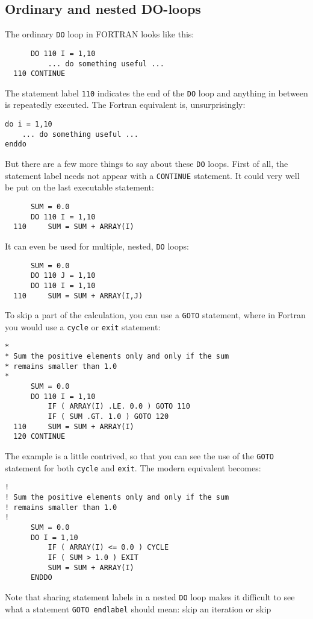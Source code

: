 \subsection{Ordinary and nested DO-loops}
The ordinary \verb+DO+ loop in FORTRAN looks like this:
%
\begin{verbatim}
      DO 110 I = 1,10
          ... do something useful ...
  110 CONTINUE
\end{verbatim}
%
The statement label \verb+110+ indicates the end of the \verb+DO+ loop and anything in between
is repeatedly executed. The Fortran equivalent is, unsurprisingly:
%
\begin{verbatim}
do i = 1,10
    ... do something useful ...
enddo
\end{verbatim}
%
But there are a few more things to say about these \verb+DO+ loops. First of all, the
statement label needs not appear with a \verb+CONTINUE+ statement. It could very well be
put on the last executable statement:
%
\begin{verbatim}
      SUM = 0.0
      DO 110 I = 1,10
  110     SUM = SUM + ARRAY(I)
\end{verbatim}
%
It can even be used for multiple, nested, \verb+DO+ loops:
%
\begin{verbatim}
      SUM = 0.0
      DO 110 J = 1,10
      DO 110 I = 1,10
  110     SUM = SUM + ARRAY(I,J)
\end{verbatim}
%
To skip a part of the calculation, you can use a \verb+GOTO+ statement, where in Fortran
you would use a \verb+cycle+ or \verb+exit+ statement:
%
\begin{verbatim}
*
* Sum the positive elements only and only if the sum
* remains smaller than 1.0
*
      SUM = 0.0
      DO 110 I = 1,10
          IF ( ARRAY(I) .LE. 0.0 ) GOTO 110
          IF ( SUM .GT. 1.0 ) GOTO 120
  110     SUM = SUM + ARRAY(I)
  120 CONTINUE
\end{verbatim}
%
The example is a little contrived, so that you can see the use of the \verb+GOTO+ statement
for both \verb+cycle+ and \verb+exit+. The modern equivalent becomes:
%
\begin{verbatim}
!
! Sum the positive elements only and only if the sum
! remains smaller than 1.0
!
      SUM = 0.0
      DO I = 1,10
          IF ( ARRAY(I) <= 0.0 ) CYCLE
          IF ( SUM > 1.0 ) EXIT
          SUM = SUM + ARRAY(I)
      ENDDO
\end{verbatim}
%
Note that sharing statement labels in a nested \verb+DO+ loop makes it difficult to
see what a statement \verb+GOTO endlabel+ should mean: skip an iteration or skip
